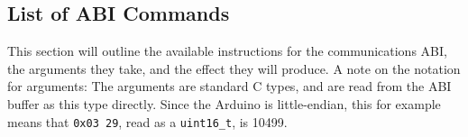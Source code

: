 \newcommand{\abispec}[6]{
\subsubsection{\texttt{#1}}

\begin{tabularx}{\textwidth}{>{\hsize=.5\hsize}XX}
\textbf{Instruction byte:}               & \texttt{#2} \\
\textbf{Argument bytes:}                 & #3 \\
\textbf{Argument type(s):}               & \texttt{#4} \\
\textbf{Action:}                         & #5 \\
\textbf{Relation to low-level commands:} & #6 \\
\end{tabularx}
}

\subsection{List of ABI Commands} \label{abi}

This section will outline the available instructions for the communications
ABI, the arguments they take, and the effect they will produce. A note on the
notation for arguments: The arguments are standard C types, and are read from
the ABI buffer as this type directly. Since the Arduino is little-endian, this
for example means that \texttt{0x03 29}, read as a \texttt{uint16\_t}, is
10499.

